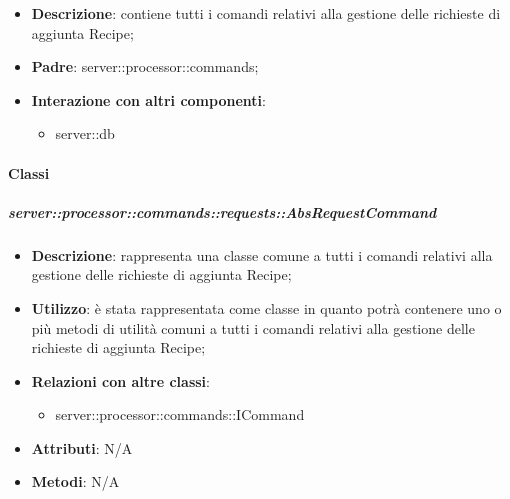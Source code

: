       \begin{itemize}
        \item \textbf{Descrizione}: contiene tutti i comandi relativi alla gestione delle richieste di aggiunta Recipe;
        \item \textbf{Padre}: server::processor::commands;
        \item \textbf{Interazione con altri componenti}:
          \begin{itemize}
            \item server::db
          \end{itemize}
      \end{itemize}

        \paragraph{Classi} %

        \subparagraph{server::processor::commands::requests::AbsRequestCommand} %
        \label{subp:bdsm_app_server_processor_commands_requests_absrequestcommand}
        \begin{itemize}
          \item \textbf{Descrizione}: rappresenta una classe comune a tutti i comandi relativi alla gestione delle richieste di aggiunta Recipe;
          \item \textbf{Utilizzo}: è stata rappresentata come classe in quanto potrà contenere uno o più metodi di utilità comuni a tutti i comandi relativi alla gestione delle richieste di aggiunta Recipe;
          \item \textbf{Relazioni con altre classi}:
            \begin{itemize}
              \item server::processor::commands::ICommand
            \end{itemize}
          \item \textbf{Attributi}: N/A
          \item \textbf{Metodi}: N/A
        \end{itemize}

